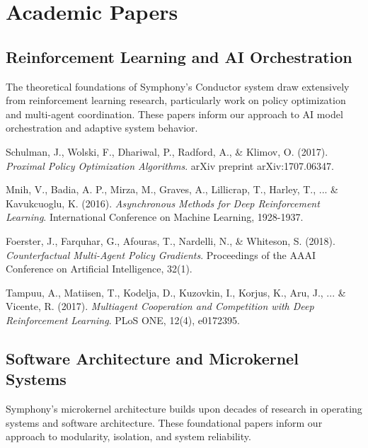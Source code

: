 \section*{Academic Papers}

\subsection*{Reinforcement Learning and AI Orchestration}

The theoretical foundations of Symphony's Conductor system draw extensively from reinforcement learning research, particularly work on policy optimization and multi-agent coordination. These papers inform our approach to AI model orchestration and adaptive system behavior.

\begin{compactlist}
    \item Schulman, J., Wolski, F., Dhariwal, P., Radford, A., \& Klimov, O. (2017). \textit{Proximal Policy Optimization Algorithms}. arXiv preprint arXiv:1707.06347.
    \item Mnih, V., Badia, A. P., Mirza, M., Graves, A., Lillicrap, T., Harley, T., ... \& Kavukcuoglu, K. (2016). \textit{Asynchronous Methods for Deep Reinforcement Learning}. International Conference on Machine Learning, 1928-1937.
    \item Foerster, J., Farquhar, G., Afouras, T., Nardelli, N., \& Whiteson, S. (2018). \textit{Counterfactual Multi-Agent Policy Gradients}. Proceedings of the AAAI Conference on Artificial Intelligence, 32(1).
    \item Tampuu, A., Matiisen, T., Kodelja, D., Kuzovkin, I., Korjus, K., Aru, J., ... \& Vicente, R. (2017). \textit{Multiagent Cooperation and Competition with Deep Reinforcement Learning}. PLoS ONE, 12(4), e0172395.
\end{compactlist}

\subsection*{Software Architecture and Microkernel Systems}

Symphony's microkernel architecture builds upon decades of research in operating systems and software architecture. These foundational papers inform our approach to modularity, isolation, and system reliability.

